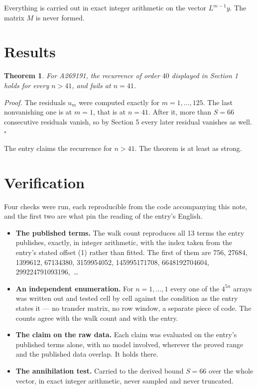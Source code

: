 \documentclass[11pt]{article}
\newtheorem{theorem}{Theorem}
\theoremstyle{definition}
\begin{document}
Everything is carried out in exact integer arithmetic on the vector $L^{m-1}y$. The matrix $M$ is never formed.

\section{Results}

\begin{theorem} For A269191, the recurrence of order $40$ displayed in Section 1 holds for every $n > 41$, and fails at $n = 41$.\end{theorem}

{\itshape Proof.} The residuals $u_m$ were computed exactly for $m = 1,\dots,125$. The last nonvanishing one is at $m = 1$, that is at $n = 41$. After it, more than $S = 66$ consecutive residuals vanish, so by Section 5 every later residual vanishes as well. $\square$

The entry claims the recurrence for $n > 41$. The theorem is at least as strong.

\section{Verification}

Four checks were run, each reproducible from the code accompanying this note, and the first two are what pin the reading of the entry's English.

\begin{itemize}

\item {\bfseries The published terms.} The walk count reproduces all 13 terms the entry publishes, exactly, in integer arithmetic, with the index taken from the entry's stated offset (1) rather than fitted. The first of them are 756, 27684, 1399612, 67134380, 3159954052, 145995171708, 6648192704604, 299224791093196,~\dots

\item {\bfseries An independent enumeration.} For $n = 1,\dots,1$ every one of the $4^{5n}$ arrays was written out and tested cell by cell against the condition as the entry states it --- no transfer matrix, no row window, a separate piece of code. The counts agree with the walk count and with the entry.

\item {\bfseries The claim on the raw data.} Each claim was evaluated on the entry's published terms alone, with no model involved, wherever the proved range and the published data overlap. It holds there.

\item {\bfseries The annihilation test.} Carried to the derived bound $S = 66$ over the whole vector, in exact integer arithmetic, never sampled and never truncated.

\end{itemize}
\end{document}
